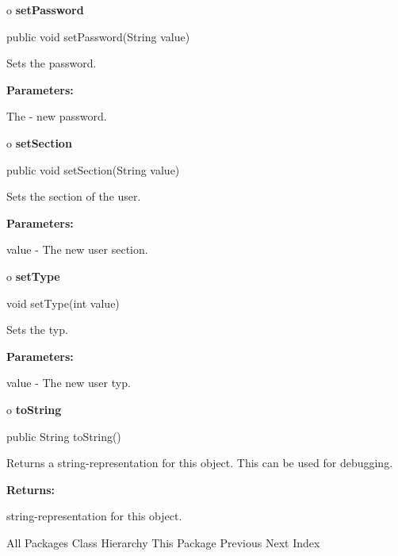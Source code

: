 o {\bf setPassword} 

\begin{PRE}
 public void setPassword(String value)
\end{PRE}

\begin{description}
\htmlDD Sets the password. 

\begin{description}
\item {\bf Parameters:}  

The - new password.  
\end{description}

\end{description}

o {\bf setSection} 

\begin{PRE}
 public void setSection(String value)
\end{PRE}

\begin{description}
\htmlDD Sets the section of the user. 

\begin{description}
\item {\bf Parameters:}  

value - The new user section.  
\end{description}

\end{description}

o {\bf setType} 

\begin{PRE}
 void setType(int value)
\end{PRE}

\begin{description}
\htmlDD Sets the typ. 

\begin{description}
\item {\bf Parameters:}  

value - The new user typ.  
\end{description}

\end{description}

o {\bf toString} 

\begin{PRE}
 public String toString()
\end{PRE}

\begin{description}
\htmlDD Returns a string-representation for this object. This can be used for
debugging. 

\begin{description}
\item {\bf Returns:}  

string-representation for this object.  
\end{description}

\end{description}

\htmlHR

\begin{PRE}
All Packages  Class Hierarchy  This Package  Previous  Next  Index
\end{PRE}

